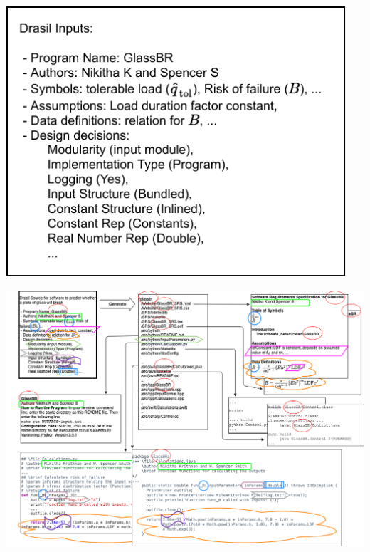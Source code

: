 \documentclass[usenames]{beamer}
\begin{document}
\begin{frame}


\includegraphics[width=0.95\textwidth]{../figures/DrasilInputs.pdf}

\end{frame}

\hoffset=-0.4in
\begin{frame}

\includegraphics[width=1.08\textwidth]{../figures/DrasilSupportsChange.png}

\end{frame}
\hoffset=0in
\end{document}
